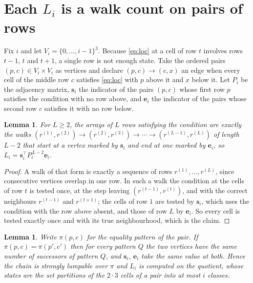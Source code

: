 \documentclass[11pt,a4paper]{article}
\theoremstyle{plain}
\newtheorem{lemma}[theorem]{Lemma}
\theoremstyle{definition}
\begin{document}
\section{Each $L_i$ is a walk count on pairs of rows}

Fix $i$ and let $V_i=\{0,\dots,i-1\}^{3}$. Because \eqref{eq:loc} at a cell of row
$t$ involves rows $t-1$, $t$ and $t+1$, a single row is not enough state. Take the
ordered pairs $(p,c)\in V_i\times V_i$ as vertices and declare $(p,c)\to(c,x)$ an edge when
every cell of the middle row $c$ satisfies \eqref{eq:loc} with $p$ above it and $x$
below it. Let $P_i$ be the adjacency matrix, $\mathbf{s}_i$ the indicator of the pairs
$(p,c)$ whose first row $p$ satisfies the condition with no row above, and
$\mathbf{e}_i$ the indicator of the pairs whose second row $c$ satisfies it with no
row below.

\begin{lemma}\label{lem:walk}
For $L\ge2$, the arrays of $L$ rows satisfying the condition are exactly the walks
$(r^{(1)},r^{(2)})\to(r^{(2)},r^{(3)})\to\cdots\to(r^{(L-1)},r^{(L)})$ of length
$L-2$ that start at a vertex marked by $\mathbf{s}_i$ and end at one marked by
$\mathbf{e}_i$, so
$L_i=\mathbf{s}_i^{\!\top}P_i^{\,L-2}\mathbf{e}_i$.
\end{lemma}

\begin{proof}
A walk of that form is exactly a sequence of rows $r^{(1)},\dots,r^{(L)}$, since
consecutive vertices overlap in one row. In such a walk the condition at the cells of
row $t$ is tested once, at the step leaving $(r^{(t-1)},r^{(t)})$, and with the
correct neighbours $r^{(t-1)}$ and $r^{(t+1)}$; the cells of row $1$ are tested by
$\mathbf{s}_i$, which uses the condition with the row above absent, and those of row
$L$ by $\mathbf{e}_i$. So every cell is tested exactly once and with its true
neighbourhood, which is the claim.
\end{proof}

\begin{lemma}\label{lem:lump}
Write $\pi(p,c)$ for the equality pattern of the pair. If $\pi(p,c)=\pi(p',c')$ then for
every pattern $Q$ the two vertices have the same number of successors of pattern $Q$, and
$\mathbf{s}_i$, $\mathbf{e}_i$ take the same value at both. Hence the chain is strongly
lumpable over $\pi$ and $L_i$ is computed on the quotient, whose states are the set
partitions of the $2\cdot3$ cells of a pair into at most $i$ classes.
\end{lemma}
\end{document}
